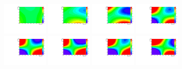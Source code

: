 \begin{figure}[thb]
  \centering
\includegraphics[width=0.2\textwidth]{figures/sec-background/correlation/res_th2F_res_th2f_res_alpha_00_n100000.pdf}
\includegraphics[width=0.2\textwidth]{figures/sec-background/correlation/res_th2F_res_th2f_res_alpha_01_n100000.pdf}
\includegraphics[width=0.2\textwidth]{figures/sec-background/correlation/res_th2F_res_th2f_res_alpha_02_n100000.pdf}
\includegraphics[width=0.2\textwidth]{figures/sec-background/correlation/res_th2F_res_th2f_res_alpha_03_n100000.pdf}
\includegraphics[width=0.2\textwidth]{figures/sec-background/correlation/res_th2F_res_th2f_res_alpha_04_n100000.pdf}
\includegraphics[width=0.2\textwidth]{figures/sec-background/correlation/res_th2F_res_th2f_res_alpha_05_n100000.pdf}
\includegraphics[width=0.2\textwidth]{figures/sec-background/correlation/res_th2F_res_th2f_res_alpha_06_n100000.pdf}
\includegraphics[width=0.2\textwidth]{figures/sec-background/correlation/res_th2F_res_th2f_res_alpha_07_n100000.pdf}

\end{figure}
